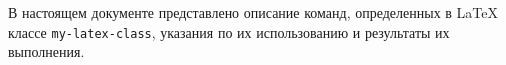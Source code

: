 
В настоящем документе представлено описание команд, определенных в \LaTeX{}
классе \lstinline:my-latex-class:, указания по их использованию и результаты их
выполнения. 